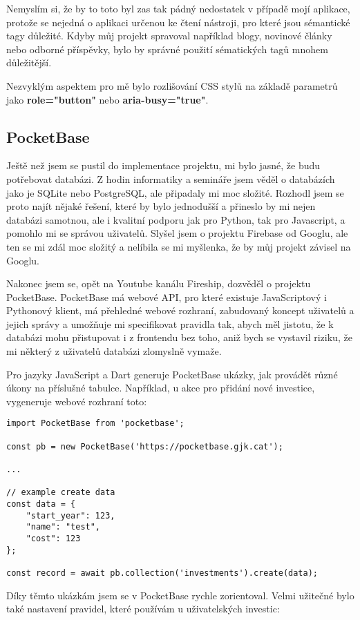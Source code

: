 \documentclass[11pt,a4paper,twoside,openright]{report}
\begin{document}
Nemyslím si, že by to toto byl zas tak pádný nedostatek v případě mojí aplikace, protože se nejedná o
aplikaci určenou ke čtení nástroji, pro které jsou sémantické tagy důležité. Kdyby můj projekt spravoval
například blogy, novinové články nebo odborné příspěvky, bylo by správné použití sématických tagů
mnohem důležitější.

Nezvyklým aspektem pro mě bylo rozlišování CSS stylů na základě parametrů jako \textbf{role="button"} nebo
\textbf{aria-busy="true"}.

\subsection{PocketBase}
Ještě než jsem se pustil do implementace projektu, mi bylo jasné, že budu potřebovat databázi. Z hodin
informatiky a semináře jsem věděl o databázích jako je SQLite nebo PostgreSQL, ale připadaly mi moc
složité. Rozhodl jsem se proto najít nějaké řešení, které by bylo jednodušší a přineslo by mi nejen databázi
samotnou, ale i kvalitní podporu jak pro Python, tak pro Javascript, a pomohlo mi se správou uživatelů.
Slyšel jsem o projektu Firebase od Googlu, ale ten se mi zdál moc složitý a nelíbila se mi myšlenka,
že by můj projekt závisel na Googlu.

Nakonec jsem se, opět na Youtube kanálu Fireship, dozvěděl o projektu PocketBase. PocketBase má webové API,
pro které existuje JavaScriptový i Pythonový klient, má přehledné webové rozhraní, zabudovaný koncept uživatelů
a jejich správy a umožňuje mi specifikovat pravidla tak, abych měl jistotu, že k databázi mohu přistupovat
i z frontendu bez toho, aniž bych se vystavil riziku, že mi některý z uživatelů databázi zlomyslně vymaže.

Pro jazyky JavaScript a Dart generuje PocketBase ukázky, jak provádět různé úkony na příslušné tabulce.
Například, u akce pro přidání nové investice, vygeneruje webové rozhraní toto:

\begin{verbatim}
import PocketBase from 'pocketbase';

const pb = new PocketBase('https://pocketbase.gjk.cat');

...

// example create data
const data = {
    "start_year": 123,
    "name": "test",
    "cost": 123
};

const record = await pb.collection('investments').create(data);
\end{verbatim}

Díky těmto ukázkám jsem se v PocketBase rychle zorientoval. Velmi užitečné bylo také nastavení pravidel,
které používám u uživatelských investic:
\end{document}
